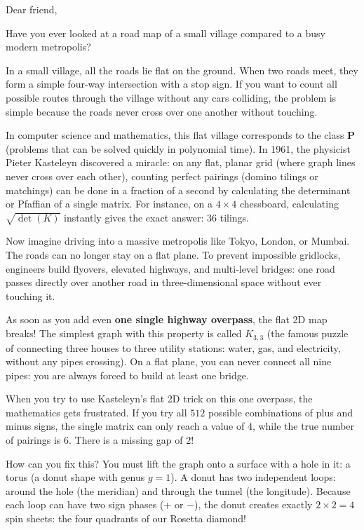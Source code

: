 \documentclass[11pt,a4paper]{article}
\theoremstyle{definition}
\begin{document}
Dear friend,

Have you ever looked at a road map of a small village compared to a busy modern metropolis?

In a small village, all the roads lie flat on the ground. When two roads meet, they form a simple four-way intersection with a stop sign. If you want to count all possible routes through the village without any cars colliding, the problem is simple because the roads never cross over one another without touching.

In computer science and mathematics, this flat village corresponds to the class \textbf{P} (problems that can be solved quickly in polynomial time). In 1961, the physicist Pieter Kasteleyn discovered a miracle: on any flat, planar grid (where graph lines never cross over each other), counting perfect pairings (domino tilings or matchings) can be done in a fraction of a second by calculating the determinant or Pfaffian of a single matrix. For instance, on a $4 \times 4$ chessboard, calculating $\sqrt{\det(K)}$ instantly gives the exact answer: $36$ tilings.

Now imagine driving into a massive metropolis like Tokyo, London, or Mumbai. The roads can no longer stay on a flat plane. To prevent impossible gridlocks, engineers build flyovers, elevated highways, and multi-level bridges: one road passes directly over another road in three-dimensional space without ever touching it.

As soon as you add even \textbf{one single highway overpass}, the flat 2D map breaks! The simplest graph with this property is called $K_{3,3}$ (the famous puzzle of connecting three houses to three utility stations: water, gas, and electricity, without any pipes crossing). On a flat plane, you can never connect all nine pipes: you are always forced to build at least one bridge.

When you try to use Kasteleyn's flat 2D trick on this one overpass, the mathematics gets frustrated. If you try all $512$ possible combinations of plus and minus signs, the single matrix can only reach a value of $4$, while the true number of pairings is $6$. There is a missing gap of $2$!

How can you fix this? You must lift the graph onto a surface with a hole in it: a torus (a donut shape with genus $g = 1$). A donut has two independent loops: around the hole (the meridian) and through the tunnel (the longitude). Because each loop can have two sign phases ($+$ or $-$), the donut creates exactly $2 \times 2 = 4$ spin sheets: the four quadrants of our Rosetta diamond!
\end{document}
